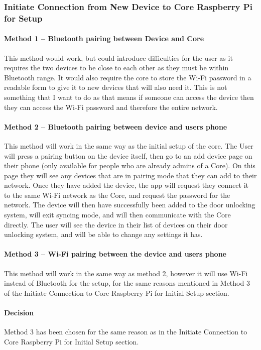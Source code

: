 \subsubsection*{Initiate Connection from New Device to Core Raspberry Pi for Setup}

\paragraph*{Method 1 – Bluetooth pairing between Device and Core}
This method would work, but could introduce difficulties for the user as it requires the two devices to be close to each other as they must be within Bluetooth range. It would also require the core to store the Wi-Fi password in a readable form to give it to new devices that will also need it. This is not something that I want to do as that means if someone can access the device then they can access the Wi-Fi password and therefore the entire network.

\paragraph*{Method 2 – Bluetooth pairing between device and users phone}
This method will work in the same way as the initial setup of the core. The User will press a pairing button on the device itself, then go to an add device page on their phone (only available for people who are already admins of a Core). On this page they will see any devices that are in pairing mode that they can add to their network. Once they have added the device, the app will request they connect it to the same Wi-Fi network as the Core, and request the password for the network. The device will then have successfully been added to the door unlocking system, will exit syncing mode, and will then communicate with the Core directly. The user will see the device in their list of devices on their door unlocking system, and will be able to change any settings it has.

\paragraph*{Method 3 – Wi-Fi pairing between the device and users phone}
This method will work in the same way as method 2, however it will use Wi-Fi instead of Bluetooth for the setup, for the same reasons mentioned in Method 3 of the Initiate Connection to Core Raspberry Pi for Initial Setup section.

\paragraph*{Decision}
Method 3 has been chosen for the same reason as in the Initiate Connection to Core Raspberry Pi for Initial Setup section.